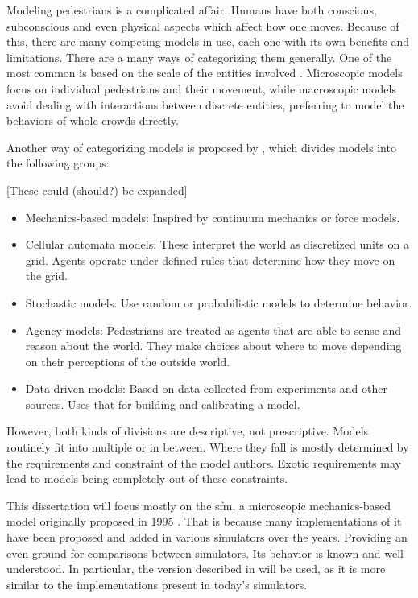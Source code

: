 \documentclass[twoside, 11pt]{article}
\begin{document}
Modeling pedestrians is a complicated affair. Humans have both conscious, subconscious and even physical aspects which affect how one moves. Because of this, there are many competing models in use, each one with its own benefits and limitations. There are a many ways of categorizing them generally. One of the most common is based on the scale of the entities involved \cite{kleinmeierVadereOpenSourceSimulation2019}. Microscopic models focus on individual pedestrians and their movement, while macroscopic models avoid dealing with interactions between discrete entities, preferring to model the behaviors of whole crowds directly.

Another way of categorizing models is proposed by \cite{martinez-gilModelingEvaluationScale2017}, which divides models into the following groups:

[These could (should?) be expanded]

\begin{itemize}
  \item Mechanics-based models: Inspired by continuum mechanics or force models.
  \item Cellular automata models: These interpret the world as discretized units on a grid. Agents operate under defined rules that determine how they move on the grid.
  \item Stochastic models: Use random or probabilistic models to determine behavior.
  \item Agency models: Pedestrians are treated as agents that are able to sense and reason about the world. They make choices about where to move depending on their perceptions of the outside world.
  \item Data-driven models: Based on data collected from experiments and other sources. Uses that for building and calibrating a model.
\end{itemize}

However, both kinds of divisions are descriptive, not prescriptive. Models routinely fit into multiple or in between. Where they fall is mostly determined by the requirements and constraint of the model authors. Exotic requirements may lead to models being completely out of these constraints.

This dissertation will focus mostly on the \gls{sfm}, a microscopic mechanics-based model originally proposed in 1995 \cite{helbingSocialForceModel1995}. That is because many implementations of it have been proposed and added in various simulators over the years. Providing an even ground for comparisons between simulators. Its behavior is known and well understood. In particular, the version described in \cite{helbingSimulatingDynamicFeatures2000} will be used, as it is more similar to the implementations present in today's simulators.
\end{document}
